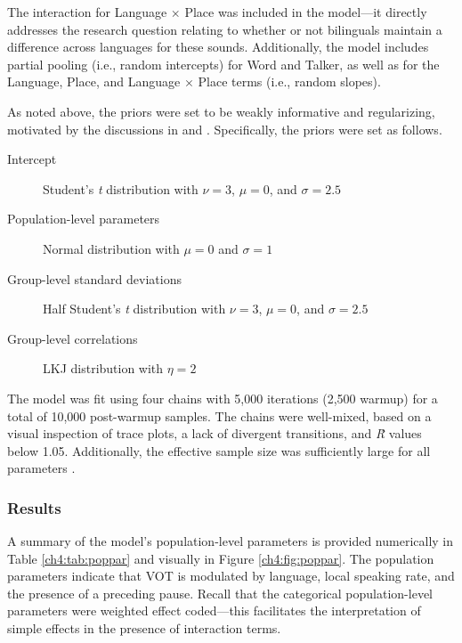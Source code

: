 The interaction for Language $\times$ Place was included in the model---it directly addresses the research question relating to whether or not bilinguals maintain a difference across languages for these sounds. Additionally, the model includes partial pooling (i.e., random intercepts) for Word and Talker, as well as for the Language, Place, and Language $\times$ Place terms (i.e., random slopes). 

As noted above, the priors were set to be weakly informative and regularizing, motivated by the discussions in \citet{gelman_2017_prior} and \citet{mcelreath_2020_sr}. Specifically, the priors were set as follows.

\begin{description}
  \item[Intercept] Student's \textit{t} distribution with $\nu = 3$, $\mu = 0$, and $\sigma = 2.5$
  \item[Population-level parameters] Normal distribution with $\mu = 0$ and $\sigma = 1$
  \item[Group-level standard deviations] Half Student's \textit{t} distribution with $\nu = 3$, $\mu = 0$, and $\sigma = 2.5$
  \item[Group-level correlations] LKJ distribution with $\eta=2$
\end{description}

The model was fit using four chains with 5,000 iterations (2,500 warmup) for a total of 10,000 post-warmup samples. The chains were well-mixed, based on a visual inspection of trace plots, a lack of divergent transitions, and \textit{\^{R}} values below 1.05. Additionally, the effective sample size was sufficiently large for all parameters \citep[for discussion, see][]{vasishth_2018_bayesian}.

\subsubsection{Results}

A summary of the model's population-level parameters is provided numerically in Table \ref{ch4:tab:poppar} and visually in Figure \ref{ch4:fig:poppar}. The population parameters indicate that VOT is modulated by language, local speaking rate, and the presence of a preceding pause. Recall that the categorical population-level parameters were weighted effect coded---this facilitates the interpretation of simple effects in the presence of interaction terms.

